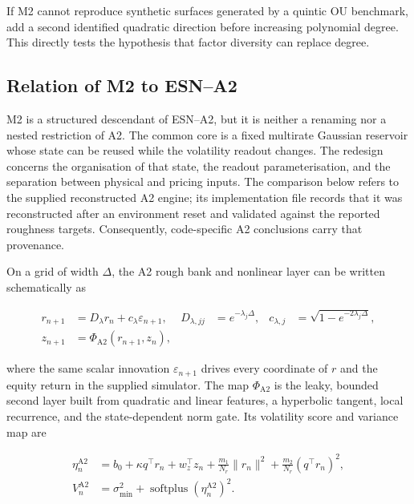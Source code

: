 \documentclass[11pt,a4paper]{article}
\begin{document}
If M2 cannot reproduce synthetic surfaces generated by a quintic OU benchmark, add a second
identified quadratic direction before increasing polynomial degree. This directly tests the
hypothesis that factor diversity can replace degree.

\subsection{Relation of M2 to ESN--A2}
\label{sec:m2-versus-a2}

M2 is a structured descendant of ESN--A2, but it is neither a renaming nor a nested
restriction of A2. The common core is a fixed multirate Gaussian reservoir whose state can be
reused while the volatility readout changes. The redesign concerns the organisation of that
state, the readout parameterisation, and the separation between physical and pricing inputs.
The comparison below refers to the supplied reconstructed A2 engine; its implementation file
records that it was reconstructed after an environment reset and validated against the reported
roughness targets. Consequently, code-specific A2 conclusions carry that provenance.

\newpage
\begin{samepage}
On a grid of width \(\Delta\), the A2 rough bank and nonlinear layer can be written schematically
as

\begin{align}
r_{n+1}
  &=D_{\lambda}r_n+c_{\lambda}\varepsilon_{n+1},
  &D_{\lambda,jj}&=e^{-\lambda_j\Delta},
  &c_{\lambda,j}&=\sqrt{1-e^{-2\lambda_j\Delta}}, \\
z_{n+1}
  &=\Phi_{\mathrm{A2}}(r_{n+1},z_n),
\end{align}
\end{samepage}

where the same scalar innovation \(\varepsilon_{n+1}\) drives every coordinate of \(r\) and the
equity return in the supplied simulator. The map \(\Phi_{\mathrm{A2}}\) is the leaky, bounded
second layer built from quadratic and linear features, a hyperbolic tangent, local recurrence,
and the state-dependent norm gate. Its volatility score and variance map are

\begin{align}
\eta_n^{\mathrm{A2}}
  &=b_0+\kappa q^\top r_n+w_z^\top z_n
    +\frac{m_1}{N_r}\lVert r_n\rVert^2
    +\frac{m_2}{N_r}(q^\top r_n)^2,
\label{eq:a2-readout}\\
V_n^{\mathrm{A2}}
  &=\sigma_{\min}^2+\operatorname{softplus}
    \!\left(\eta_n^{\mathrm{A2}}\right)^2.
\label{eq:a2-variance}
\end{align}
\end{document}
